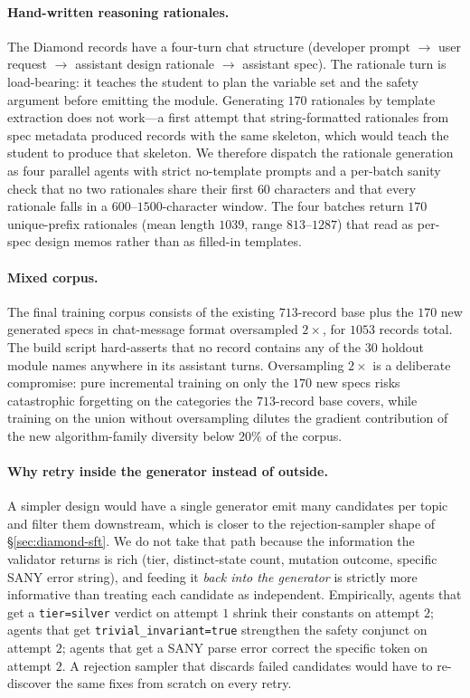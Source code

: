\documentclass[11pt]{article}
\begin{document}
\paragraph{Hand-written reasoning rationales.} The Diamond records have
a four-turn chat structure (developer prompt $\to$ user request $\to$
assistant design rationale $\to$ assistant spec). The rationale turn is
load-bearing: it teaches the student to plan the variable set and the
safety argument before emitting the module. Generating $170$ rationales
by template extraction does not work---a first attempt that
string-formatted rationales from spec metadata produced records with the
same skeleton, which would teach the student to produce that skeleton.
We therefore dispatch the rationale generation as four parallel agents
with strict no-template prompts and a per-batch sanity check that no two
rationales share their first $60$ characters and that every rationale
falls in a $600$--$1500$-character window. The four batches return
$170$ unique-prefix rationales (mean length $1039$, range $813$--$1287$)
that read as per-spec design memos rather than as filled-in templates.

\paragraph{Mixed corpus.} The final training corpus consists of the
existing $713$-record base plus the $170$ new generated specs in
chat-message format oversampled $2\!\times$, for $1053$ records total.
The build script hard-asserts that no record contains any of the
$30$ holdout module names anywhere in its assistant turns.
Oversampling $2\!\times$ is a deliberate compromise: pure incremental
training on only the $170$ new specs risks catastrophic forgetting on
the categories the $713$-record base covers, while training on the
union without oversampling dilutes the gradient contribution of the
new algorithm-family diversity below $20\%$ of the corpus.

\paragraph{Why retry inside the generator instead of outside.} A simpler
design would have a single generator emit many candidates per topic and
filter them downstream, which is closer to the rejection-sampler shape
of \S\ref{sec:diamond-sft}. We do not take that path because the
information the validator returns is rich (tier, distinct-state count,
mutation outcome, specific SANY error string), and feeding it
\emph{back into the generator} is strictly more informative than
treating each candidate as independent. Empirically, agents that get a
\texttt{tier=silver} verdict on attempt $1$ shrink their constants on
attempt $2$; agents that get \texttt{trivial\_invariant=true}
strengthen the safety conjunct on attempt $2$; agents that get a SANY
parse error correct the specific token on attempt $2$. A rejection
sampler that discards failed candidates would have to re-discover the
same fixes from scratch on every retry.
\end{document}
